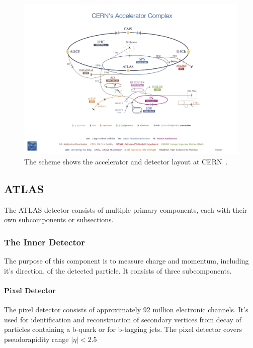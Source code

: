 \documentclass[12pt,a4paper]{article}
\numberwithin{equation}{section}
\begin{document}
\begin{figure}[H]
	\includegraphics[width=\linewidth]{figures/cern.jpg}
	\caption{The scheme shows the accelerator and detector layout at
    CERN~\cite{Haffner:1621894}.}\label{fig:lhc}
\end{figure}


\subsection{ATLAS}


The ATLAS detector consists of multiple primary components, each with their own
subcomponents or subsections.

\subsubsection{The Inner Detector}
The purpose of this component is to measure charge and momentum, including it's
direction, of the detected particle. It consists of three subcomponents. 
\paragraph{Pixel Detector}
The pixel detector consists of approximately 92 million electronic channels.
It's used for identification and reconstruction of secondary vertices from decay
of particles containing a b-quark or for b-tagging jets. The pixel detector
covers pseudorapidity range $|\eta| < 2.5 $
\end{document}
